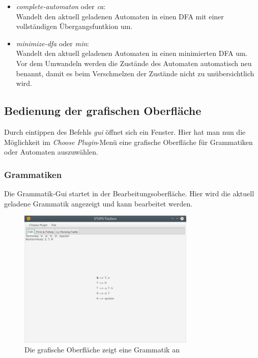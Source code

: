 \begin{itemize}
\begin{itemize}
		\item \textit{complete-automaton} oder \textit{ca}:\\
		Wandelt den aktuell geladenen Automaten in einen DFA mit einer vollständigen Übergangsfuntkion um.
		\item \textit{minimize-dfa} oder \textit{min}:\\
		Wandelt den aktuell geladenen Automaten in einen minimierten DFA um. Vor dem Umwandeln werden die Zustände des Automaten automatisch neu benannt, damit es beim Verschmelzen der Zustände nicht zu unübersichtlich wird.
	\end{itemize}
\end{itemize}
\subsection{Bedienung der grafischen Oberfläche}
\label{sec:2.4}
Durch eintippen des Befehls \textit{gui} öffnet sich ein Fenster. Hier hat man nun die Möglichkeit im \textit{Choose Plugin}-Menü eine grafische Oberfläche für Grammatiken oder Automaten auszuwählen.
\subsubsection{Grammatiken}
\label{sec:2.4.1}
Die Grammatik-Gui startet in der Bearbeitungsoberfläche. Hier wird die aktuell geladene Grammatik angezeigt und kann bearbeitet werden.
\begin{figure}[H]
	\centering
	\includegraphics[width=0.75\textwidth]{bilder/gui1.png}
	\caption{Die grafische Oberfläche zeigt eine Grammatik an}
	\label{fig:pic4}
\end{figure}
